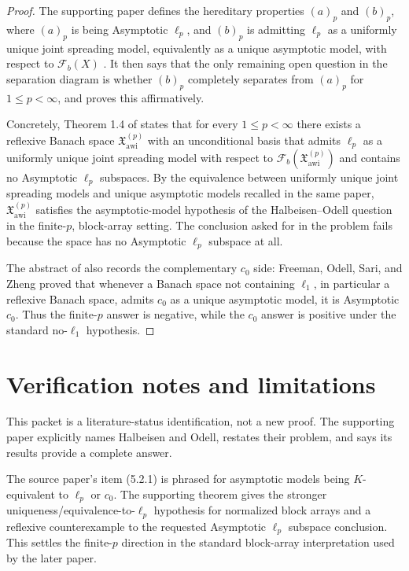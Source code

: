 \documentclass[11pt]{article}
\newcommand{\ellone}{\ell_1}
\newcommand{\cnull}{c_0}
\newcommand{\Fb}{\mathscr{F}_b}
\begin{document}
\begin{proof}
The supporting paper defines the hereditary properties
\((a)_p\) and \((b)_p\), where \((a)_p\) is being Asymptotic \(\ell_p\), and
\((b)_p\) is admitting \(\ell_p\) as a uniformly unique joint spreading model,
equivalently as a unique asymptotic model, with respect to \(\Fb(X)\)
\cite{AGMM}.  It then says that the only remaining open question in the
separation diagram is whether \((b)_p\) completely separates from \((a)_p\)
for \(1\leq p<\infty\), and proves this affirmatively.

Concretely, Theorem 1.4 of \cite{AGMM} states that for every
\(1\leq p<\infty\) there exists a reflexive Banach space
\(\mathfrak X_{\mathrm{awi}}^{(p)}\) with an unconditional basis that admits
\(\ell_p\) as a uniformly unique joint spreading model with respect to
\(\Fb(\mathfrak X_{\mathrm{awi}}^{(p)})\) and contains no Asymptotic
\(\ell_p\) subspaces.  By the equivalence between uniformly unique joint
spreading models and unique asymptotic models recalled in the same paper,
\(\mathfrak X_{\mathrm{awi}}^{(p)}\) satisfies the asymptotic-model
hypothesis of the Halbeisen--Odell question in the finite-\(p\), block-array
setting.  The conclusion asked for in the problem fails because the space has
no Asymptotic \(\ell_p\) subspace at all.

The abstract of \cite{AGMM} also records the complementary \(\cnull\) side:
Freeman, Odell, Sari, and Zheng proved that whenever a Banach space not
containing \(\ellone\), in particular a reflexive Banach space, admits
\(\cnull\) as a unique asymptotic model, it is Asymptotic \(\cnull\).
Thus the finite-\(p\) answer is negative, while the \(\cnull\) answer is
positive under the standard no-\(\ellone\) hypothesis.
\end{proof}

\section*{Verification notes and limitations}

This packet is a literature-status identification, not a new proof.  The
supporting paper explicitly names Halbeisen and Odell, restates their problem,
and says its results provide a complete answer.

The source paper's item (5.2.1) is phrased for asymptotic models being
\(K\)-equivalent to \(\ell_p\) or \(\cnull\).  The supporting theorem gives the
stronger uniqueness/equivalence-to-\(\ell_p\) hypothesis for normalized block
arrays and a reflexive counterexample to the requested Asymptotic \(\ell_p\)
subspace conclusion.  This settles the finite-\(p\) direction in the standard
block-array interpretation used by the later paper.
\end{document}
